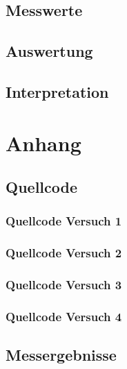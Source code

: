\documentclass[12pt,oneside,a4paper]{report}
\begin{document}
\section{Messwerte}
\label{chap:VERSUCH_4_MESSWERTE}

\section{Auswertung}
\label{chap:VERSUCH_4_AUSWERTUNG}

\section{Interpretation}
\label{chap:VERSUCH_4_INTERPRETATION}
%
%
\renewcommand\thesection{A.\arabic{section}}
\renewcommand\thesubsection{\thesection.\arabic{subsection}}

\chapter*{Anhang}
\label{chap:APPENDIX}
\addtocounter{chapter}{1}
\setcounter{section}{0}

\section{Quellcode}
\label{chap:APPENDIX_SOURCECODE}

\subsection{Quellcode Versuch 1}
\label{chap:APPENDIX_SOURCECODE_V1}

\subsection{Quellcode Versuch 2}
\label{chap:APPENDIX_SOURCECODE_V2}

\subsection{Quellcode Versuch 3}
\label{chap:APPENDIX_SOURCECODE_V3}

\subsection{Quellcode Versuch 4}
\label{chap:APPENDIX_SOURCECODE_V4}


\section{Messergebnisse}
\label{chap:APPENDIX_MEASUREMENT_SOURCE}

%
%

\end{document}
